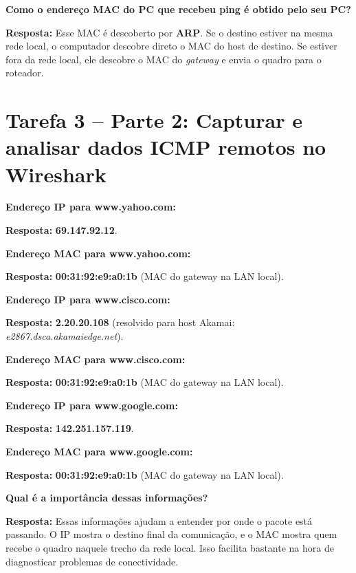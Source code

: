 \documentclass[12pt,a4paper]{article}
\newcommand{\resposta}[1]{\textbf{Resposta:} #1}
\begin{document}
\vspace{0.7em}
\noindent\textbf{Como o endereço MAC do PC que recebeu ping é obtido pelo seu PC?}

\resposta{Esse MAC é descoberto por \textbf{ARP}. Se o destino estiver na mesma rede local, o computador descobre direto o MAC do host de destino. Se estiver fora da rede local, ele descobre o MAC do \textit{gateway} e envia o quadro para o roteador.}

\section*{Tarefa 3 -- Parte 2: Capturar e analisar dados ICMP remotos no Wireshark}

\noindent\textbf{Endereço IP para www.yahoo.com:}

\resposta{\textbf{69.147.92.12}.}

\vspace{0.6em}
\noindent\textbf{Endereço MAC para www.yahoo.com:}

\resposta{\textbf{00:31:92:e9:a0:1b} (MAC do gateway na LAN local).}

\vspace{0.8em}
\noindent\textbf{Endereço IP para www.cisco.com:}

\resposta{\textbf{2.20.20.108} (resolvido para host Akamai: \textit{e2867.dsca.akamaiedge.net}).}

\vspace{0.6em}
\noindent\textbf{Endereço MAC para www.cisco.com:}

\resposta{\textbf{00:31:92:e9:a0:1b} (MAC do gateway na LAN local).}

\vspace{0.8em}
\noindent\textbf{Endereço IP para www.google.com:}

\resposta{\textbf{142.251.157.119}.}

\vspace{0.6em}
\noindent\textbf{Endereço MAC para www.google.com:}

\resposta{\textbf{00:31:92:e9:a0:1b} (MAC do gateway na LAN local).}

\vspace{0.8em}
\noindent\textbf{Qual é a importância dessas informações?}

\resposta{Essas informações ajudam a entender por onde o pacote está passando. O IP mostra o destino final da comunicação, e o MAC mostra quem recebe o quadro naquele trecho da rede local. Isso facilita bastante na hora de diagnosticar problemas de conectividade.}
\end{document}

